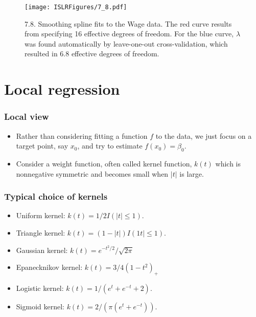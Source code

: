 \documentclass{beamer}
\begin{document}
                         \begin{frame}
                         	\frametitle{ }
                         	\begin{figure}
                         		\centering
                         		
                         		\centering
                         		\texttt{[image: ISLRFigures/7\_8.pdf]}
                         		\caption{\scriptsize 7.8. Smoothing spline fits to the Wage data. The red curve results
                         			from specifying 16 effective degrees of freedom. For the blue curve, $\lambda$ was found
                         			automatically by leave-one-out cross-validation, which resulted in 6.8 effective
                         			degrees of freedom.
                         		}
                         	\end{figure}
                         \end{frame}
\section{Local regression}


\begin{frame}
	\frametitle{Local view }
	\begin{itemize}
		\item  Rather than considering fitting a function $f$ to the data, we just focus on 
		a target point, say $x_0$, and try to estimate $f(x_0) = \beta_0 $. 
		\item  Consider a weight function, often called kernel function, 
	 $k(t)$ which is nonnegative symmetric and becomes small when $|t|$ is large.
	 	\end{itemize}
	 \end{frame} 
	
	\begin{frame}
		\frametitle{Typical choice of kernels }
		\begin{itemize}
	  
	 	\item Uniform kernel:  $k(t) = 1/2 I(|t| \leq 1)$.
	 	\item Triangle kernel: $k(t) = (1- |t|)I(1t| \leq 1)$.
	 	\item Gaussian kernel:
	 	$k(t) = e^{-t^2/2}/\sqrt{2\pi}$
	 	\item Epanecknikov kernel:
	 	$k(t) = 3/4 (1- t^2)_+$
	 \item Logistic kernel: $k(t) = 1/(e^t + e^{-t} +2)$.
	 \item Sigmoid kernel: $k(t) = 2/(\pi(e^t + e^{-t}))$. 
		 
	\end{itemize}
\end{frame} 
  
\end{document}
